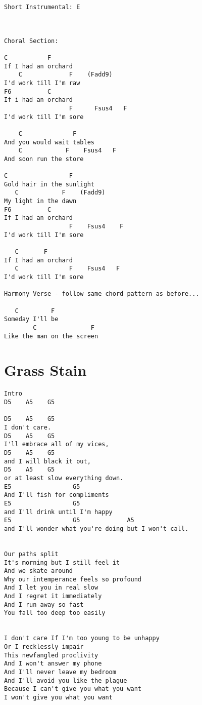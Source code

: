 \documentclass[leqno]{memoir}
\begin{document}
\begin{verbatim}
Short Instrumental: E



Choral Section:

C           F
If I had an orchard
    C             F    (Fadd9)
I'd work till I'm raw
F6          C
If i had an orchard
                  F      Fsus4   F
I'd work till I'm sore

    C              F
And you would wait tables
    C            F    Fsus4   F
And soon run the store

C                 F
Gold hair in the sunlight
   C            F    (Fadd9)
My light in the dawn
F6          C
If I had an orchard
                  F    Fsus4    F
I'd work till I'm sore

   C       F
If I had an orchard
   C              F    Fsus4   F
I'd work till I'm sore

Harmony Verse - follow same chord pattern as before...

   C         F
Someday I'll be
        C               F
Like the man on the screen

\end{verbatim}
\newpage

\chapter{Grass Stain}
\begin{verbatim}
Intro
D5    A5    G5

D5    A5    G5
I don't care.
D5    A5    G5
I'll embrace all of my vices,
D5    A5    G5
and I will black it out,
D5    A5    G5
or at least slow everything down.
E5                 G5
And I'll fish for compliments
E5                 G5
and I'll drink until I'm happy
E5                 G5             A5
and I'll wonder what you're doing but I won't call.


Our paths split
It's morning but I still feel it
And we skate around
Why our intemperance feels so profound
And I let you in real slow
And I regret it immediately
And I run away so fast
You fall too deep too easily


I don't care If I'm too young to be unhappy
Or I recklessly impair
This newfangled proclivity
And I won't answer my phone
And I'll never leave my bedroom
And I'll avoid you like the plague
Because I can't give you what you want
I won't give you what you want 
\end{verbatim}
\newpage
\end{document}
